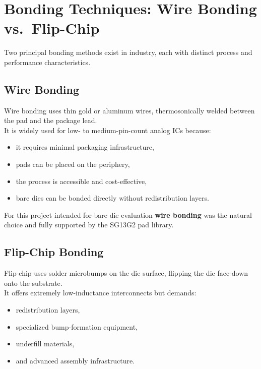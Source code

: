 \documentclass[
  11pt,
  a4paper,
  oneside]{scrbook}
\providecommand{\tightlist}{%
  \setlength{\itemsep}{0pt}\setlength{\parskip}{0pt}}
\begin{document}
\section{Bonding Techniques: Wire Bonding
vs.~Flip-Chip}\label{bonding-techniques-wire-bonding-vs.-flip-chip}

Two principal bonding methods exist in industry, each with distinct
process and performance characteristics.

\subsection{Wire Bonding}\label{wire-bonding}

Wire bonding uses thin gold or aluminum wires, thermosonically welded
between the pad and the package lead.\\
It is widely used for low- to medium-pin-count analog ICs because:

\begin{itemize}
\tightlist
\item
  it requires minimal packaging infrastructure,\\
\item
  pads can be placed on the periphery,\\
\item
  the process is accessible and cost-effective,\\
\item
  bare dies can be bonded directly without redistribution layers.
\end{itemize}

For this project intended for bare-die evaluation \textbf{wire bonding}
was the natural choice and fully supported by the SG13G2 pad library.

\subsection{Flip-Chip Bonding}\label{flip-chip-bonding}

Flip-chip uses solder microbumps on the die surface, flipping the die
face-down onto the substrate.\\
It offers extremely low-inductance interconnects but demands:

\begin{itemize}
\tightlist
\item
  redistribution layers,\\
\item
  specialized bump-formation equipment,\\
\item
  underfill materials,\\
\item
  and advanced assembly infrastructure.
\end{itemize}
\end{document}

